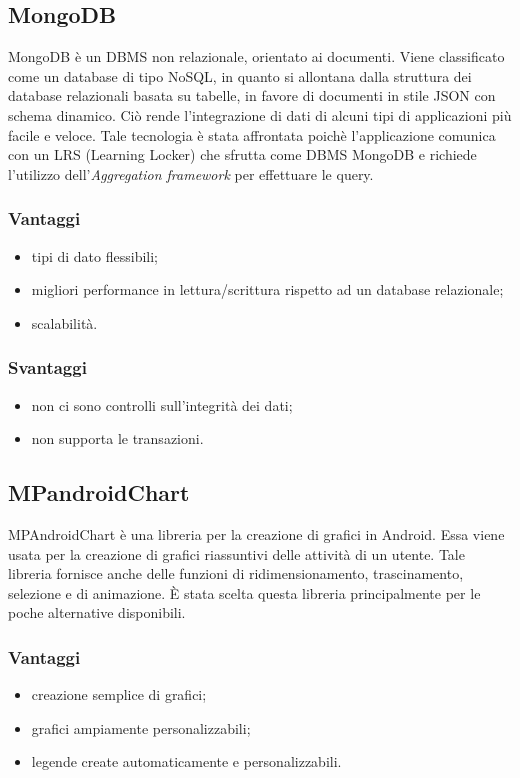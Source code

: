\documentclass[../Tesi.tex]{subfiles}
\begin{document}
	\subsection{MongoDB}
	MongoDB è un DBMS non relazionale, orientato ai documenti. Viene classificato come un database
	di tipo NoSQL, in quanto si allontana dalla struttura dei database relazionali basata su tabelle, in favore di documenti in stile JSON con schema dinamico. Ciò rende l’integrazione di dati di alcuni tipi di applicazioni più facile e veloce. Tale tecnologia è stata affrontata poichè l'applicazione comunica con un LRS (Learning Locker) che sfrutta come DBMS MongoDB e richiede l'utilizzo dell'\textit{Aggregation framework} per effettuare le query. 
		\subsubsection{Vantaggi}
			\begin{itemize}
				\item tipi di dato flessibili;
				\item migliori performance in lettura/scrittura rispetto ad un database relazionale;
				\item scalabilità.
			\end{itemize}
		\subsubsection{Svantaggi}
			\begin{itemize}
				\item non ci sono controlli sull'integrità dei dati;
				\item non supporta le transazioni.
			\end{itemize}

	\subsection{MPandroidChart}
		MPAndroidChart è una libreria per la creazione di grafici in Android. Essa viene usata per la creazione di grafici riassuntivi delle attività di un utente. Tale libreria fornisce anche delle funzioni di ridimensionamento, trascinamento, selezione e di animazione. È stata scelta questa libreria principalmente per le poche alternative disponibili.
		\subsubsection{Vantaggi}
			\begin{itemize}
				\item creazione semplice di grafici;
				\item grafici ampiamente personalizzabili;
				\item legende create automaticamente e personalizzabili.
			\end{itemize}
\end{document}
